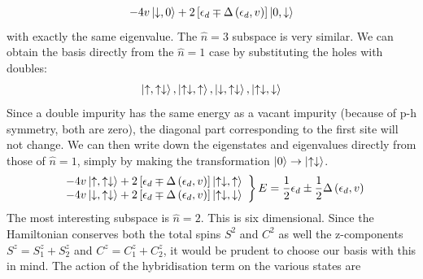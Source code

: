 \documentclass[12pt,twoside]{report}
\numberwithin{equation}{section}
\begin{document}
\begin{equation}\begin{aligned}
	-4v\ket{\downarrow,0} + 2 \left[ \epsilon_d \mp \Delta\left(\epsilon_d , v \right)\right] \ket{0, \downarrow}
\end{aligned}\end{equation}
with exactly the same eigenvalue.
\pb The \(\hat n = 3\) subspace is very similar. We can obtain the basis directly from the \(\hat n = 1\) case by substituting the holes with doubles:
\begin{equation}\begin{aligned}
	\ket{\uparrow,\uparrow \downarrow}, \ket{\uparrow \downarrow,\uparrow}, \ket{\downarrow,\uparrow \downarrow}, \ket{\uparrow \downarrow,\downarrow}
\end{aligned}\end{equation}
Since a double impurity has the same energy as a vacant impurity (because of p-h symmetry, both are zero), the diagonal part corresponding to the first site will not change. We can then write down the eigenstates and eigenvalues directly from those of \(\hat n=1\), simply by making the transformation \(\ket{0} \to \ket{ \uparrow \downarrow}\).
\begin{align}
	\left.
	\begin{array}{l}
	-4v \ket{\uparrow,\uparrow \downarrow} +  2\left[ \epsilon_d \mp \Delta\left(\epsilon_d , v\right)  \right] \ket{\uparrow \downarrow, \uparrow}\\
	-4v \ket{\downarrow,\uparrow \downarrow} + 2 \left[ \epsilon_d \mp \Delta\left(\epsilon_d, v\right)  \right] \ket{\uparrow \downarrow, \downarrow}\end{array}
	\right\}
	E = \frac{1}{2} \epsilon_d \pm \frac{1}{2}\Delta\left(\epsilon_d , v \right)
\end{align}
The most interesting subspace is \(\hat n=2\). This is six dimensional. Since the Hamiltonian conserves both the total spins \(S^2\) and \(C^2\) as well the z-components \(S^z = S_1^z + S^z_2\) and \(C^z = C_1^z + C^z_2\), it would be prudent to choose our basis with this in mind. The action of the hybridisation term on the various states are
\end{document}
